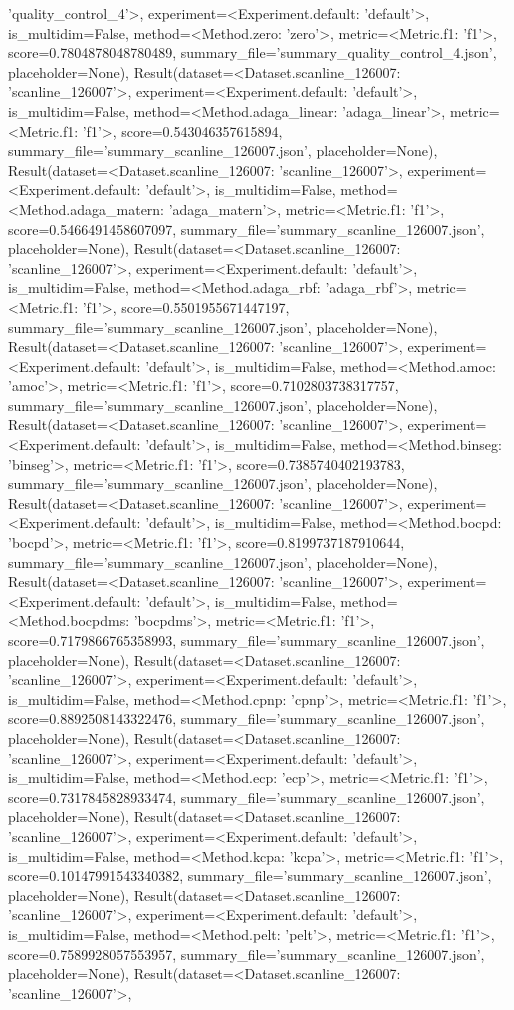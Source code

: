 'quality_control_4'>, experiment=<Experiment.default: 'default'>, is_multidim=False, method=<Method.zero: 'zero'>, metric=<Metric.f1: 'f1'>, score=0.7804878048780489, summary_file='summary_quality_control_4.json', placeholder=None), Result(dataset=<Dataset.scanline_126007: 'scanline_126007'>, experiment=<Experiment.default: 'default'>, is_multidim=False, method=<Method.adaga_linear: 'adaga_linear'>, metric=<Metric.f1: 'f1'>, score=0.543046357615894, summary_file='summary_scanline_126007.json', placeholder=None), Result(dataset=<Dataset.scanline_126007: 'scanline_126007'>, experiment=<Experiment.default: 'default'>, is_multidim=False, method=<Method.adaga_matern: 'adaga_matern'>, metric=<Metric.f1: 'f1'>, score=0.5466491458607097, summary_file='summary_scanline_126007.json', placeholder=None), Result(dataset=<Dataset.scanline_126007: 'scanline_126007'>, experiment=<Experiment.default: 'default'>, is_multidim=False, method=<Method.adaga_rbf: 'adaga_rbf'>, metric=<Metric.f1: 'f1'>, score=0.5501955671447197, summary_file='summary_scanline_126007.json', placeholder=None), Result(dataset=<Dataset.scanline_126007: 'scanline_126007'>, experiment=<Experiment.default: 'default'>, is_multidim=False, method=<Method.amoc: 'amoc'>, metric=<Metric.f1: 'f1'>, score=0.7102803738317757, summary_file='summary_scanline_126007.json', placeholder=None), Result(dataset=<Dataset.scanline_126007: 'scanline_126007'>, experiment=<Experiment.default: 'default'>, is_multidim=False, method=<Method.binseg: 'binseg'>, metric=<Metric.f1: 'f1'>, score=0.7385740402193783, summary_file='summary_scanline_126007.json', placeholder=None), Result(dataset=<Dataset.scanline_126007: 'scanline_126007'>, experiment=<Experiment.default: 'default'>, is_multidim=False, method=<Method.bocpd: 'bocpd'>, metric=<Metric.f1: 'f1'>, score=0.8199737187910644, summary_file='summary_scanline_126007.json', placeholder=None), Result(dataset=<Dataset.scanline_126007: 'scanline_126007'>, experiment=<Experiment.default: 'default'>, is_multidim=False, method=<Method.bocpdms: 'bocpdms'>, metric=<Metric.f1: 'f1'>, score=0.7179866765358993, summary_file='summary_scanline_126007.json', placeholder=None), Result(dataset=<Dataset.scanline_126007: 'scanline_126007'>, experiment=<Experiment.default: 'default'>, is_multidim=False, method=<Method.cpnp: 'cpnp'>, metric=<Metric.f1: 'f1'>, score=0.8892508143322476, summary_file='summary_scanline_126007.json', placeholder=None), Result(dataset=<Dataset.scanline_126007: 'scanline_126007'>, experiment=<Experiment.default: 'default'>, is_multidim=False, method=<Method.ecp: 'ecp'>, metric=<Metric.f1: 'f1'>, score=0.7317845828933474, summary_file='summary_scanline_126007.json', placeholder=None), Result(dataset=<Dataset.scanline_126007: 'scanline_126007'>, experiment=<Experiment.default: 'default'>, is_multidim=False, method=<Method.kcpa: 'kcpa'>, metric=<Metric.f1: 'f1'>, score=0.10147991543340382, summary_file='summary_scanline_126007.json', placeholder=None), Result(dataset=<Dataset.scanline_126007: 'scanline_126007'>, experiment=<Experiment.default: 'default'>, is_multidim=False, method=<Method.pelt: 'pelt'>, metric=<Metric.f1: 'f1'>, score=0.7589928057553957, summary_file='summary_scanline_126007.json', placeholder=None), Result(dataset=<Dataset.scanline_126007: 'scanline_126007'>, 